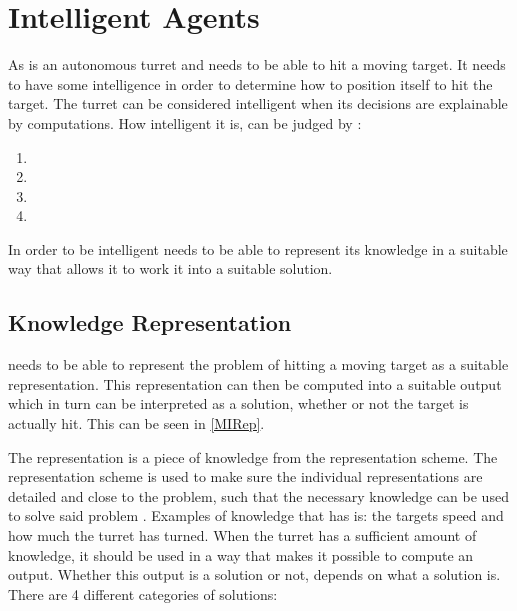\section{Intelligent Agents}
 
As \name is an autonomous turret and needs to be able to hit a moving target.
It needs to have some intelligence in order to determine how to position itself
to hit the target. The turret can be considered intelligent when its decisions are explainable by computations.
How intelligent it is, can be judged by \citep[ch.1.1]{MIBook}:

\begin{enumerate}
  
  \item {}
  \item {}
  \item {}
  \item {}
\end{enumerate}

In order to be intelligent \name needs to be able to represent its
knowledge in a suitable way that allows it to work it into a suitable solution. 

\subsection{Knowledge Representation}\label{KR}

\name needs to be able to represent the problem of hitting a
moving target as a suitable representation. This representation can then be
computed into a suitable output which in turn can be interpreted as
a solution, whether or not the target is actually hit. This can be seen in
\autoref{MIRep}.


The representation is a piece of knowledge from the representation
scheme. The representation scheme is used to make sure the individual
representations are detailed and close to the problem, such that the necessary
knowledge can be used to solve said problem \citep{MIBook}. Examples of
knowledge that \name has is: the targets speed and how much the turret has
turned. When the turret has a sufficient amount of knowledge, it should be used
in a way that makes it possible to compute an output. Whether this output is a
solution or not, depends on what a solution is. There are 4 different categories
of solutions:

